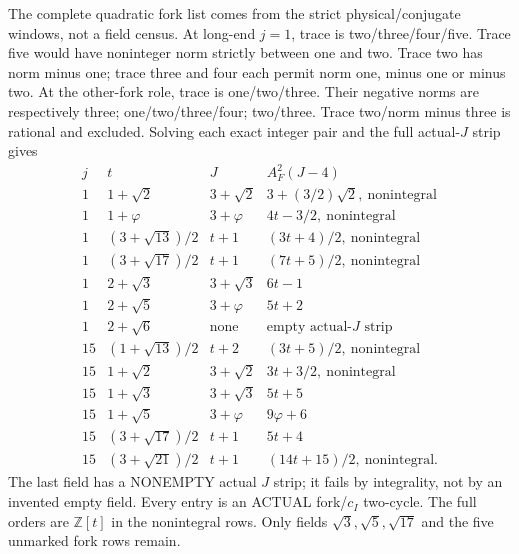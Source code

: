 \documentclass[11pt]{article}
\begin{document}
The complete quadratic fork list comes
from the strict physical/conjugate
windows, not a field census.
At long-end \(j=1\), trace is
two/three/four/five.
Trace five would have noninteger norm
strictly between one and two.
Trace two has norm minus one;
trace three and four each permit
norm one, minus one or minus two.
At the other-fork role, trace is
one/two/three.
Their negative norms are respectively
three; one/two/three/four; two/three.
Trace two/norm minus three is rational
and excluded.
Solving each exact integer pair and
the full actual-\(J\) strip gives
\[
\begin{array}{c|c|c|l}
 j&t&J&A_F^2(J-4)\\ \hline
1&1+\sqrt2&3+\sqrt2&3+(3/2)\sqrt2,\ \text{nonintegral}\\
1&1+\varphi&3+\varphi&4t-3/2,\ \text{nonintegral}\\
1&(3+\sqrt{13})/2&t+1&(3t+4)/2,\ \text{nonintegral}\\
1&(3+\sqrt{17})/2&t+1&(7t+5)/2,\ \text{nonintegral}\\
1&2+\sqrt3&3+\sqrt3&6t-1\\
1&2+\sqrt5&3+\varphi&5t+2\\
1&2+\sqrt6&\text{none}&\text{empty actual-}J\text{ strip}\\
15&(1+\sqrt{13})/2&t+2&(3t+5)/2,\ \text{nonintegral}\\
15&1+\sqrt2&3+\sqrt2&3t+3/2,\ \text{nonintegral}\\
15&1+\sqrt3&3+\sqrt3&5t+5\\
15&1+\sqrt5&3+\varphi&9\varphi+6\\
15&(3+\sqrt{17})/2&t+1&5t+4\\
15&(3+\sqrt{21})/2&t+1&(14t+15)/2,\ \text{nonintegral}.
\end{array}
\]
The last field has a NONEMPTY actual
\(J\) strip; it fails by integrality,
not by an invented empty field.
Every entry is an ACTUAL fork/\(c_I\)
two-cycle.
The full orders are \(\mathbb Z[t]\)
in the nonintegral rows.
Only fields \(\sqrt3,\sqrt5,\sqrt{17}\)
and the five unmarked fork rows remain.
\end{document}
